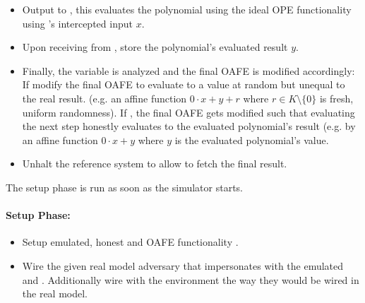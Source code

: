 \begin{itemize}

  \item Output  to \JWfuncSymOPEnp{}, this evaluates the
    polynomial using the ideal OPE functionality using \JWpTwo{}'s intercepted
    input $x$.

  \item Upon receiving  from \JWfuncSymOPEnp{}, store
    the polynomial's evaluated result $y$.

  \item Finally, the variable  is analyzed and the final OAFE is
    modified accordingly: If  modify the final OAFE to
    evaluate to a value at random but unequal to the real result. (e.g. an
    affine function $0 \cdot x + y + r$ where $r \in K \setminus \{0\}$ is
    fresh, uniform randomness). If , the final OAFE
    gets modified such that evaluating the next step honestly evaluates to the
    evaluated polynomial's result (e.g. by an affine function $0 \cdot x + y$
    where $y$ is the evaluated polynomial's value.

  \item Unhalt the reference system to allow \JWadv{} to fetch the final
    result.

\end{itemize}


\label{sec:simulator-goliath}

The setup phase is run as soon as the simulator starts.

\paragraph{Setup Phase:}

\begin{itemize}

  \item Setup emulated, honest \JWpTwo{} and OAFE functionality
    \JWfuncSymOAFE{}.

  \item Wire the given real model adversary \JWadv{} that impersonates \JWpOne{}
    with the emulated \JWpTwo{} and \JWfuncSymOAFE{}. Additionally wire \JWadv{}
    with the environment the way they would be wired in the real model.

\end{itemize}

